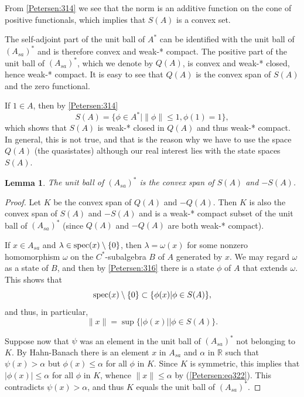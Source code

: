 \documentclass{book}
\newtheorem{lemma}[definition]{Lemma}
\begin{document}
From \ref{Petersen:314} we see that the norm is an additive function on the cone of positive functionals,
which implies that \(S(A)\) is a convex set.\par
The self-adjoint part of the unit ball of \(A^*\) can be identified with the unit ball of \((A_{sa})^*\) and is therefore convex
and weak-* compact. The positive part of the unit ball of \((A_{sa})^*\), which we denote by \(Q(A)\), is convex and weak-* closed,
hence weak-* compact. It is easy to see that \(Q(A)\) is the convex span of \(S(A)\) and the zero functional.\par
If \(1\in A\), then by \ref{Petersen:314}
\[
  S(A)=\{\phi\in A^*| \|\phi\|\leq1, \phi(1)=1\},
\]
which shows that \(S(A)\) is weak-* closed in \(Q(A)\) and thus weak-* compact.
In general, this is not true, and that is the reason why we have to use the space \(Q(A)\)
(the quasistates) although our real interest lies with the state spaces \(S(A)\).

\begin{lemma}\label{Petersen:322}
  The unit ball of \((A_{sa})^*\) is the convex span of \(S(A)\) and \(-S(A)\).
\end{lemma}
\begin{proof}
  Let \(K\) be the convex span of \(Q(A)\) and \(-Q(A)\). Then \(K\) is also the convex span of \(S(A)\)
  and \(-S(A)\) and is a weak-* compact subset of the unit ball of \((A_{sa})^*\) (since \(Q(A)\) and \(-Q(A)\) are both weak-* compact).\par
  If \(x\in A_{sa}\) and \(\lambda\in \textnormal{spec}(x)\setminus\{0\}\), then \(\lambda=\omega(x)\) for some nonzero
  homomorphism \(\omega\) on the \(C^*\)-subalgebra \(B\) of \(A\) generated by \(x\).
  We may regard \(\omega\) as a state of \(B\), and then by \ref{Petersen:316} there is a state \(\phi\) of \(A\) that extends \(\omega\).
  This shows that 
  \[
    \textnormal{spec}(x)\setminus\{0\}\subset\{\phi(x)| \phi\in S(A)\},
  \]
  and thus, in particular,
  \begin{equation}\label{Petersen:eq322}
    \|x\|=\sup\{|\phi(x)|| \phi\in S(A)\}.
  \end{equation}\par
  Suppose now that \(\psi\) was an element in the unit ball of \((A_{sa})^*\) not belonging to \(K\).
  By Hahn-Banach there is an element \(x\) in \(A_{sa}\) and \(\alpha\) in \(\mathbb{R}\)
  such that \(\psi(x)>\alpha\) but \(\phi(x)\leq\alpha\) for all \(\phi\) in \(K\). Since \(K\) is symmetric, this implies
  that \(|\phi(x)|\leq\alpha\) for all \(\phi\) in \(K\), whence \(\|x\|\leq\alpha\) by (\ref{Petersen:eq322}).
  This contradicts \(\psi(x)>\alpha\), and thus \(K\) equals the unit ball of \((A_{sa})^*\).
\end{proof}
\end{document}
